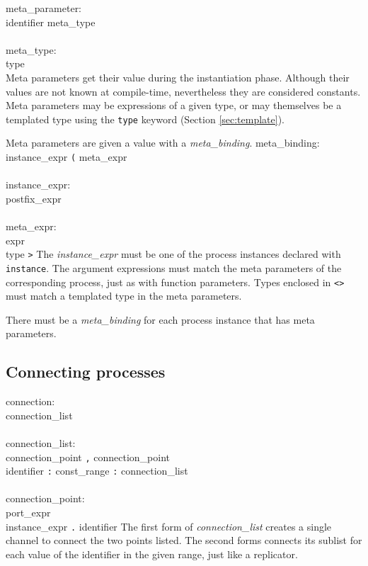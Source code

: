 \grammarstart
meta\_parameter: \\
      \>identifier\LIST {\tt{}:} meta\_type \\
 \\
meta\_type: \\
      \>type \\
\grammarend
Meta parameters get their value during the instantiation phase. Although
their values are not known at compile-time, nevertheless they are considered
constants.  Meta parameters may be expressions of a given type, or may themselves
be a templated type using the {\tt{}type} keyword (Section \ref{sec:template}).

Meta parameters are given a value with a {\it{}meta\_binding}.
\grammarstart
meta\_binding: \\
      \>instance\_expr {\tt{}(} meta\_expr\LIST {\tt{})} \\
 \\
instance\_expr: \\
      \>postfix\_expr \\
 \\
meta\_expr: \\
      \>expr \\
      \>{\tt{}<} type {\tt{}>}
\grammarend
The {\it{}instance\_expr} must be one of the process instances declared with
{\tt{}instance}. The argument expressions must match the meta parameters
of the corresponding process, just as with function parameters.  Types enclosed
in {\tt{}<>} must match a templated type in the meta parameters.

There must be a {\it{}meta\_binding} for each process instance that has
meta parameters.


\subsection{Connecting processes}\label{sec:connect}

\grammarstart
connection: \\
       connection\_list \\
 \\
connection\_list: \\
           connection\_point {\tt{},} connection\_point \\
\orbox {} identifier {\tt{}:} const\_range {\tt{}:} connection\_list \\
 \\
connection\_point: \\
       \>port\_expr \\
\orbox \>instance\_expr {\tt{}.} identifier
\grammarend
The first form of {\it{}connection\_list} creates a single channel to
connect the two points listed.
The second forms connects its sublist for each value of the identifier in
the given range, just like a replicator.

